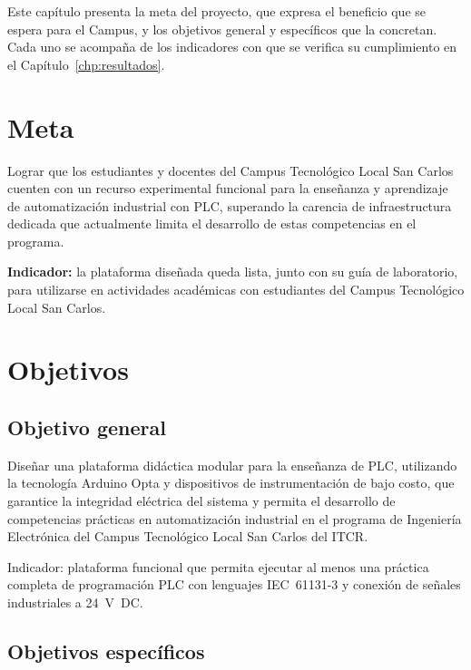 \documentclass[12pt,a4paper,oneside]{report}
\begin{document}
Este capítulo presenta la meta del proyecto, que expresa el beneficio que se espera para el Campus, y los objetivos general y específicos que la concretan. Cada uno se acompaña de los indicadores con que se verifica su cumplimiento en el Capítulo~\ref{chp:resultados}.

\section{Meta}

Lograr que los estudiantes y docentes del Campus Tecnológico Local San Carlos cuenten con un recurso experimental funcional para la enseñanza y aprendizaje de automatización industrial con PLC, superando la carencia de infraestructura dedicada que actualmente limita el desarrollo de estas competencias en el programa.

\textbf{Indicador:} la plataforma diseñada queda lista, junto con su guía de laboratorio, para utilizarse en actividades académicas con estudiantes del Campus Tecnológico Local San Carlos.

\section{Objetivos}

\subsection{Objetivo general}

Diseñar una plataforma didáctica modular para la enseñanza de PLC, utilizando la tecnología Arduino Opta y dispositivos de instrumentación de bajo costo, que garantice la integridad eléctrica del sistema y permita el desarrollo de competencias prácticas en automatización industrial en el programa de Ingeniería Electrónica del Campus Tecnológico Local San Carlos del ITCR.

Indicador: plataforma funcional que permita ejecutar al menos una práctica completa de programación PLC con lenguajes IEC~61131-3 y conexión de señales industriales a 24~V~DC.

\subsection{Objetivos específicos}
\end{document}
